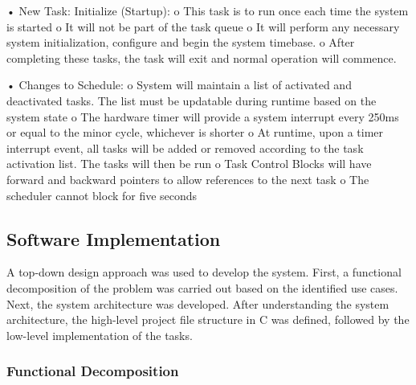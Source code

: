 \documentclass[12pt]{article} %
\begin{document}
\begin{itemize}
•	New Task: Initialize (Startup):
o	This task is to run once each time the system is started
o	It will not be part of the task queue
o	It will perform any necessary system initialization, configure and begin the system timebase.
o	After completing these tasks, the task will exit and normal operation will commence.

•	Changes to Schedule:
o	System will maintain a list of activated and deactivated tasks. The list must be updatable during runtime based on the system state
o	The hardware timer will provide a system interrupt every 250ms or equal to the minor cycle, whichever is shorter
o	At runtime, upon a timer interrupt event, all tasks will be added or removed according to the task activation list. The tasks will then be run
o	Task Control Blocks will have forward and backward pointers to allow references to the next task
o	The scheduler cannot block for five seconds
\end{itemize}

\subsection{Software Implementation}

A top-down design approach was used to develop the system.  First, a functional decomposition of the problem was carried out based on the identified use cases.  Next, the system architecture was developed.  After understanding the system architecture, the high-level project file structure in C was defined, followed by the low-level implementation of the tasks.

\subsubsection{Functional Decomposition}

\end{document}
